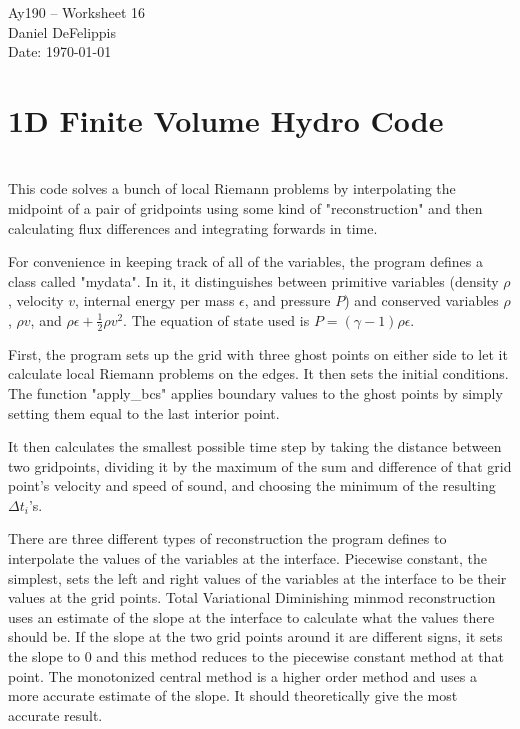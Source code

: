 \documentclass[11pt,letterpaper]{article}
\begin{document}
\begin{center}
\Large
Ay190 -- Worksheet 16\\
Daniel DeFelippis\\
Date: \today
\end{center}


\section*{1D Finite Volume Hydro Code}

\section{}

This code solves a bunch of local Riemann problems by interpolating the midpoint of
a pair of gridpoints using some kind of "reconstruction" and then calculating flux 
differences and integrating forwards in time.

For convenience in keeping track of all of the variables, the program defines
a class called "mydata". In it, it distinguishes between primitive variables (density 
$\rho$, velocity $v$, internal energy per mass $\epsilon$, and pressure $P$) and 
conserved variables $\rho$, $\rho v$, and $\rho\epsilon + \frac{1}{2}\rho v^2$. The
equation of state used is $P = (\gamma - 1)\rho\epsilon$. 

First, the program sets up the grid with three ghost points on either side to 
let it calculate local Riemann problems on the edges. It then sets the initial conditions.
The function "apply\_bcs" applies boundary values to the ghost points by 
simply setting them equal to the last interior point. 

It then calculates the smallest possible time step by taking the distance between two
gridpoints, dividing it by the maximum of the sum and difference of that grid point's 
velocity and speed of sound, and choosing the minimum of the resulting $\Delta t_i$'s.

There are three different types of reconstruction the program defines to interpolate
the values of the variables at the interface. Piecewise constant, the simplest, sets the
left and right values of the variables at the interface to be their values at the grid
points. Total Variational Diminishing minmod reconstruction uses an estimate of the slope
at the interface to calculate what the values there should be. If the slope at the 
two grid points around it are different signs, it sets the slope to 0 and this method
reduces to the piecewise constant method at that point. The monotonized central method 
is a higher order method and uses a more accurate estimate of the slope. It should 
theoretically give the most accurate result.
\end{document}
